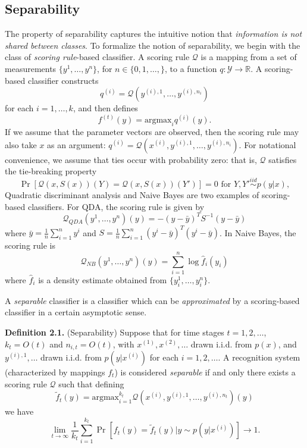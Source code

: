 \documentclass{article}
\newcommand{\argmax}{\text{argmax}}
\begin{document}
\subsection{Separability}

The property of separability captures the intuitive notion that \emph{information is not shared between classes}.
To formalize the notion of separability, we begin with the class of \emph{scoring rule}-based classifier.
A scoring rule $\mathcal{Q}$ is a mapping from a set of measurements $\{y^1,\hdots, y^n\}$, for $n \in \{0, 1,\hdots, \}$, to a function 
$q: \mathcal{Y} \to \mathbb{R}.$
A scoring-based classifier constructs
\[
q^{(i)} = \mathcal{Q}(y^{(i),1},\hdots, y^{(i), n_i})
\]
for each $i = 1,\hdots, k$, and then defines
 \[
f^{(t)}(y) = \argmax_i q^{(i)}(y).
\]
If we assume that the parameter vectors are observed, then the scoring rule may also take $x$ as an argument:
$q^{(i)} = \mathcal{Q}(x^{(i)}, y^{(i),1},\hdots, y^{(i), n_i})$.
For notational convenience, we assume that ties occur with probability zero: that is, $\mathcal{Q}$ satisfies the tie-breaking property
\begin{equation}\label{eq:tie}
\Pr[\mathcal{Q}(x, S(x))(Y) = \mathcal{Q}(x, S(x))(Y')] = 0\text{ for }Y, Y' \stackrel{iid}{\sim} p(y|x),
\end{equation}
Quadratic discriminant analysis and Naive Bayes are two examples of scoring-based classifiers.
For QDA, the scoring rule is given by
\[
\mathcal{Q}_{QDA}(y^1,\hdots, y^n)(y) = -(y - \bar{y})^T S^{-1} (y-\bar{y})
\]
where $\bar{y} = \frac{1}{n}\sum_{i=1}^n y^i$ and $S = \frac{1}{n}\sum_{i=1}^n (y^i - \bar{y})^T(y^i - \bar{y})$.
In Naive Bayes, the scoring rule is
\[
\mathcal{Q}_{NB}(y^1,\hdots, y^n)(y) = \sum_{i=1}^n \log \hat{f}_i(y_i)
\]
where $\hat{f}_i$ is a density estimate obtained from $\{y^1_i,\hdots, y^n_i\}$.

A \emph{separable} classifier is a classifier which can be \emph{approximated} by a scoring-based classifier
in a certain asymptotic sense.  

\textbf{Definition 2.1.}  (Separability) Suppose that for time stages $t = 1,2,\hdots$, $k_t = O(t)$ and $n_{i,t} = O(t)$,
with $x^{(1)}, x^{(2)},\hdots$ drawn i.i.d. from $p(x)$, and $y^{(i),1},\hdots$ drawn i.i.d. from $p(y|x^{(i)})$ for each $i = 1,2,\hdots$.
A recognition system (characterized by mappings $f_t$) is considered \emph{separable} if and only there exists a scoring rule $\mathcal{Q}$
such that defining
\[
\tilde{f}_t(y) = \argmax_{i=1}^{k_t} \mathcal{Q}(x^{(i)}, y^{(i), 1},\hdots, y^{(i), n_t})(y)
\]
we have
\[
\lim_{t \to \infty} \frac{1}{k_t} \sum_{i=1}^{k_t}\Pr[f_t(y) = \tilde{f}_t(y) | y \sim p(y|x^{(i)})] \to 1.
\]
\end{document}
